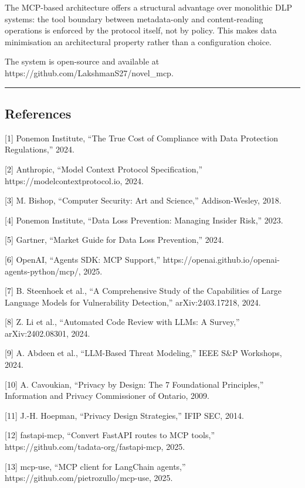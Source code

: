 \documentclass[
]{article}
\begin{document}
The MCP-based architecture offers a structural advantage over monolithic
DLP systems: the tool boundary between metadata-only and content-reading
operations is enforced by the protocol itself, not by policy. This makes
data minimisation an architectural property rather than a configuration
choice.

The system is open-source and available at
https://github.com/LakshmanS27/novel\_mcp.

\begin{center}\rule{0.5\linewidth}{0.5pt}\end{center}

\subsection{References}\label{references}

{[}1{]} Ponemon Institute, ``The True Cost of Compliance with Data
Protection Regulations,'' 2024.

{[}2{]} Anthropic, ``Model Context Protocol Specification,''
https://modelcontextprotocol.io, 2024.

{[}3{]} M. Bishop, ``Computer Security: Art and Science,''
Addison-Wesley, 2018.

{[}4{]} Ponemon Institute, ``Data Loss Prevention: Managing Insider
Risk,'' 2023.

{[}5{]} Gartner, ``Market Guide for Data Loss Prevention,'' 2024.

{[}6{]} OpenAI, ``Agents SDK: MCP Support,''
https://openai.github.io/openai-agents-python/mcp/, 2025.

{[}7{]} B. Steenhoek et al., ``A Comprehensive Study of the Capabilities
of Large Language Models for Vulnerability Detection,''
arXiv:2403.17218, 2024.

{[}8{]} Z. Li et al., ``Automated Code Review with LLMs: A Survey,''
arXiv:2402.08301, 2024.

{[}9{]} A. Abdeen et al., ``LLM-Based Threat Modeling,'' IEEE S\&P
Workshops, 2024.

{[}10{]} A. Cavoukian, ``Privacy by Design: The 7 Foundational
Principles,'' Information and Privacy Commissioner of Ontario, 2009.

{[}11{]} J.-H. Hoepman, ``Privacy Design Strategies,'' IFIP SEC, 2014.

{[}12{]} fastapi-mcp, ``Convert FastAPI routes to MCP tools,''
https://github.com/tadata-org/fastapi-mcp, 2025.

{[}13{]} mcp-use, ``MCP client for LangChain agents,''
https://github.com/pietrozullo/mcp-use, 2025.
\end{document}
